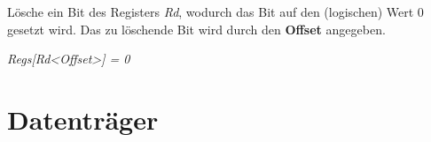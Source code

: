 Lösche ein Bit des Registers \textit{Rd}, wodurch das Bit auf den (logischen)
Wert 0 gesetzt wird. Das zu löschende Bit wird durch den \textbf{Offset} angegeben.

\textit{Regs[Rd<Offset>] = 0}
\chapter{Datenträger}
